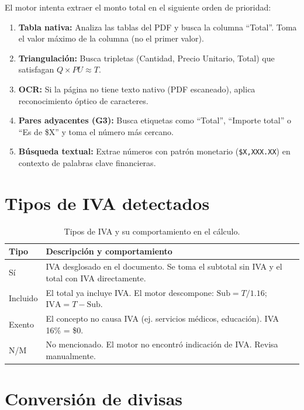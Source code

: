 \documentclass[12pt, a4paper, oneside]{report}
\begin{document}
El motor intenta extraer el monto total en el siguiente orden de prioridad:

\begin{enumerate}
  \item \textbf{Tabla nativa:} Analiza las tablas del PDF y busca la columna
        ``Total''. Toma el valor máximo de la columna (no el primer valor).
  \item \textbf{Triangulación:} Busca tripletas (Cantidad, Precio Unitario, Total)
        que satisfagan $Q \times PU \approx T$.
  \item \textbf{OCR:} Si la página no tiene texto nativo (PDF escaneado),
        aplica reconocimiento óptico de caracteres.
  \item \textbf{Pares adyacentes (G3):} Busca etiquetas como ``Total'',
        ``Importe total'' o ``Es de \$X'' y toma el número más cercano.
  \item \textbf{Búsqueda textual:} Extrae números con patrón monetario
        (\texttt{\$X,XXX.XX}) en contexto de palabras clave financieras.
\end{enumerate}

\section{Tipos de IVA detectados}

\begin{table}[H]
  \centering
  \begin{tabularx}{\linewidth}{lX}
    \toprule
    \textbf{Tipo} & \textbf{Descripción y comportamiento} \\
    \midrule
    Sí        & IVA desglosado en el documento. Se toma el subtotal sin IVA y el total con IVA directamente. \\
    Incluido  & El total ya incluye IVA. El motor descompone: $\text{Sub} = T / 1.16$;
                $\text{IVA} = T - \text{Sub}$. \\
    Exento    & El concepto no causa IVA (ej. servicios médicos, educación).
                IVA 16\% = \$0. \\
    N/M       & No mencionado. El motor no encontró indicación de IVA. Revisa manualmente. \\
    \bottomrule
  \end{tabularx}
  \caption{Tipos de IVA y su comportamiento en el cálculo.}
\end{table}

\section{Conversión de divisas}
\end{document}
